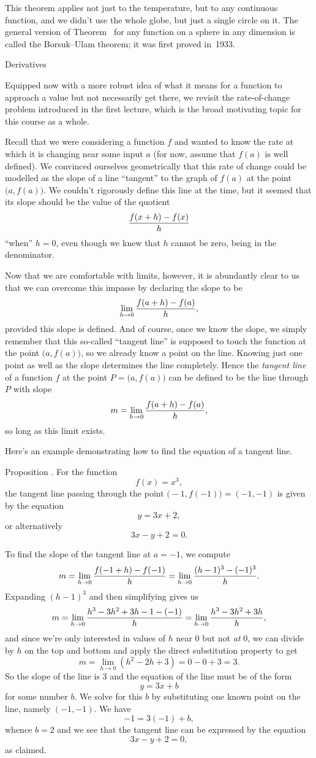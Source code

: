 This theorem applies not just to the temperature, but to any continuous function, and we didn't use the whole
globe, but just a single circle on it. The general version of Theorem~{\thmtemp}
for any function on a sphere in any dimension is called the Borsuk--Ulam theorem; it was first proved in~1933.

\advsect Derivatives

Equipped now with a more robust idea of what it means for a function to approach a value but not necessarily
get there, we revisit the rate-of-change problem introduced in the first lecture, which is
the broad motivating topic for this course as a whole.

Recall that we were considering a function $f$ and wanted to know the rate at which it is changing
near some input $a$ (for now, assume that $f(a)$ is well defined).
We convinced ourselves geometrically that this rate of change could be modelled
as the slope of a line ``tangent'' to the graph of $f(a)$ at the point $\bigl(a,f(a)\bigr)$. We couldn't
rigorously define this line at the time, but it seemed that its slope should be the value of the quotient
$${f(x+h) - f(x)\over h}$$
``when'' $h=0$, even though we knew that $h$ cannot be zero, being in the denominator.

Now that we are comfortable with limits, however, it is abundantly clear to us that we can overcome this
impasse by declaring the slope to be
$$\lim_{h\to 0} {f(a+h) - f(a) \over h},$$
provided this slope is defined. And of course, once we know the slope, we simply remember that this
so-called ``tangent line'' is supposed to touch the function at the point $\bigl(a,f(a)\bigr)$, so we already
know a point on the line. Knowing just one point as well as the slope determines the line completely.
Hence the {\it tangent line} of a function $f$ at the point $P = \bigl(a, f(a)\bigr)$ can be defined to be
the line through $P$ with slope
$$m= \lim_{h\to 0} {f(a+h) - f(a) \over h},$$
so long as this limit exists.

Here's an example demonstrating how to find the equation of a tangent line.

\proclaim Proposition \advthm. For the function
$$f(x) = x^3,$$
the tangent line passing through the point $\bigl( -1, f(-1)\bigr) = (-1, -1)$ is given by the equation
$$y=3x+2,$$
or alternatively
$$3x-y+2 = 0.$$

\proof
To find the slope of the tangent line at $a=-1$, we compute
$$m = \lim_{h\to 0} {f(-1+h) - f(-1)\over h} = \lim_{h\to 0} {(h-1)^3 - (-1)^3\over h}.$$
Expanding $(h-1)^3$ and then simplifying gives us
$$m = \lim_{h\to 0} { h^3 - 3h^2 + 3h -1 - (-1)\over h} = 
\lim_{h\to 0} {h^3 - 3h^2 + 3h \over h},$$
and since
we're only interested in values of $h$ near $0$ but not {\it at} $0$,
we can divide by $h$ on the top and bottom and apply
the direct substitution property to get
$$m = \lim_{h\to 0}(h^2 - 2h + 3) = 0-0+3 = 3.$$
So the slope of the line is $3$ and the equation of the line must be of the form
$$y= 3x+b$$
for some number $b$. We solve for this $b$ by substituting
one known point on the line, namely $(-1,-1)$.
We have
$$-1 = 3(-1) + b,$$
whence $b=2$ and we see that the tangent line can be expressed by the equation
$$3x-y+2 = 0,$$
as claimed.\slug

